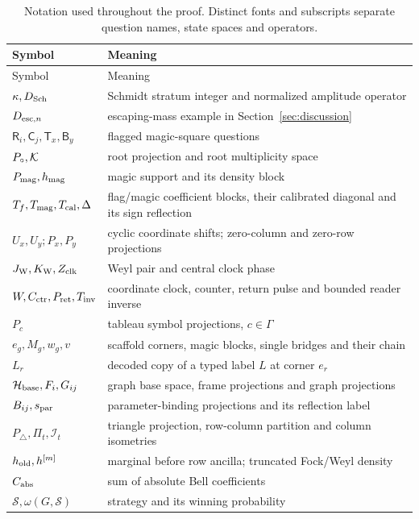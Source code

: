 \begin{longtable}{@{}p{.32\linewidth}p{.61\linewidth}@{}}
\caption{Notation used throughout the proof. Distinct fonts and subscripts
separate question names, state spaces and operators.}\label{tab:notation}\\
\toprule Symbol & Meaning\\\midrule\endfirsthead
\toprule Symbol & Meaning\\\midrule\endhead
$\kappa,D_{\rm Sch}$ & Schmidt stratum integer and normalized amplitude operator\\
$D_{{\rm esc},n}$ & escaping-mass example in Section~\ref{sec:discussion}\\
$\mathsf R_i,\mathsf C_j,\mathsf T_x,\mathsf B_y$ & flagged magic-square questions\\
$P_{\circ},\mathcal K$ & root projection and root multiplicity space\\
$P_{\rm mag},h_{\rm mag}$ & magic support and its density block\\
$T_f,T_{\rm mag},T_{\rm cal},\Delta$ & flag/magic coefficient blocks, their calibrated diagonal and its sign reflection\\
$U_x,U_y;P_x,P_y$ & cyclic coordinate shifts; zero-column and zero-row projections\\
$J_{\rm W},K_{\rm W},Z_{\rm clk}$ & Weyl pair and central clock phase\\
$W,C_{\rm ctr},P_{\rm ret},T_{\rm inv}$ & coordinate clock, counter, return pulse and bounded reader inverse\\
$P_c$ & tableau symbol projections, $c\in\Gamma$\\
$e_g,M_g,w_g,v$ & scaffold corners, magic blocks, single bridges and their chain\\
$L_r$ & decoded copy of a typed label $L$ at corner $e_r$\\
$\mathcal H_{\rm base},F_i,G_{ij}$ & graph base space, frame projections and graph projections\\
$B_{ij},s_{\rm par}$ & parameter-binding projections and its reflection label\\
$P_\triangle,\Pi_t,\mathcal I_t$ & triangle projection, row-column partition and column isometries\\
$h_{\rm old},h^{[m]}$ & marginal before row ancilla; truncated Fock/Weyl density\\
$C_{\rm abs}$ & sum of absolute Bell coefficients\\
$\mathcal S,\omega(G,\mathcal S)$ & strategy and its winning probability\\
\bottomrule
\end{longtable}
